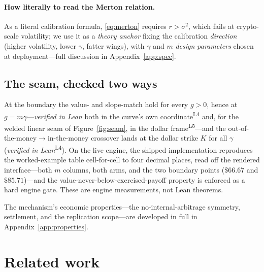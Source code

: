 \documentclass[runningheads]{llncs}
\newcommand{\tfp}{\emph{verified in Lean}}
\begin{document}
\paragraph{How literally to read the Merton relation.}
As a literal calibration formula, \eqref{eq:merton} requires $r>\sigma^{2}$,
which fails at crypto-scale volatility; we use it as a \emph{theory anchor}
fixing the calibration \emph{direction} (higher volatility, lower $\gamma$,
fatter wings), with $\gamma$ and $m$ \emph{design parameters} chosen at
deployment---full discussion in Appendix~\ref{app:spec}.

\subsection{The seam, checked two ways}
At the boundary the value- and slope-match hold for every $g>0$, hence at
$g=m\gamma$---\tfp{} both in the curve's own coordinate\textsuperscript{L4}
and, for the welded linear seam of Figure~\ref{fig:seam}, in the dollar
frame\textsuperscript{L5}---and the out-of-the-money$\to$in-the-money
crossover lands at the dollar strike $K$ for all $\gamma$
(\tfp{}\textsuperscript{L4}). On the live engine, the shipped implementation
reproduces the worked-example table cell-for-cell to four decimal places, read off
the rendered interface---both $m$ columns, both arms, and the two boundary points
($\$66.67$ and $\$85.71$)---and the value-never-below-exercised-payoff property is
enforced as a hard engine gate. These are engine measurements, not Lean theorems.

The mechanism's economic properties---the no-internal-arbitrage symmetry,
settlement, and the replication scope---are developed in full in
Appendix~\ref{app:properties}.

\section{Related work}\label{sec:related}
\end{document}
